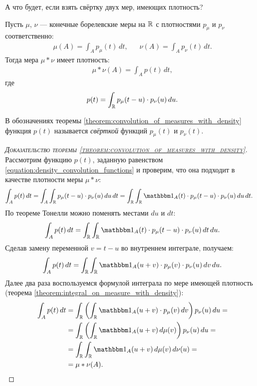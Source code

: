 \documentclass[../main.tex]{subfiles}
\begin{document}
А что будет, если взять свёртку двух мер, имеющих плотность?

\begin{thm}
 \label{theorem:convolution_of_measures_with_density}
 Пусть $ \mu $, $ \nu $ --- конечные борелевские меры на $ \mathbb{R} $ с плотностями $ p_\mu $ и $ p_\nu $ соответственно:
 \begin{align*}
  \mu(A) = \int_{A} p_\mu(t)\,dt, & &\nu(A) = \int_{A} p_\nu(t)\,dt.  
 \end{align*} Тогда мера $ \mu \ast \nu $ имеет плотность:
 \begin{align*}
  \mu \ast \nu(A) = \int_{A} p(t)\,dt, 
 \end{align*} где
 \begin{align}
  \label{equation:density_convolution_functions}
  p(t) = \int_{\mathbb{R}} p_\mu(t - u) \cdot p_\nu(u)\,du.
 \end{align} 
\end{thm}
\begin{df}
 В обозначениях теоремы \ref{theorem:convolution_of_measures_with_density} функция $ p(t) $ называется \textit{свёрткой} функций $ p_\mu(t) $ и $ p_{\nu}(t) $.
\end{df}
\begin{proof}[\normalfont\textsc{Доказательство теоремы \ref{theorem:convolution_of_measures_with_density}}] Рассмотрим функцию $ p(t) $, заданную равенством \eqref{equation:density_convolution_functions} и проверим, что она подходит в качестве плотности меры $ \mu \ast \nu $:
 \begin{align*}
  \int_{A} p(t)\,dt &= \int_{A} \int_{\R}p_\mu(t - u)\cdot p_\nu(u)\,du\,dt = \int_{\R} \int_{\R} \Ind_A(t) \cdot p_\mu(t-u) \cdot p_\nu(u)\,du\,dt.
 \end{align*} По теореме Тонелли можно поменять местами $ du $ и $ dt $:
 \begin{align*}
  \int_{A} p(t)\,dt = \int_{\R} \int_{\R} \Ind_A(t) \cdot p_\mu(t-u) \cdot p_\nu(u)\,dt\,du. 
 \end{align*} Сделав замену переменной $ v = t - u  $ во внутреннем интеграле, получаем:
 \begin{align*}
  \int_{A} p(t)\,dt = \int_{\R}\int_{\R}\Ind_A(u + v) \cdot p_\mu(v)\cdot p_\nu(u)\,dv\,du.
 \end{align*} Далее два раза воспользуемся формулой интеграла по мере имеющей плотность (теорема \ref{theorem:integral_on_measure_with_density}):
 \begin{align*}
  \int_{A} p(t)\,dt &= \int_{\R} \left( \int_{\R} \Ind_A(u+v) \cdot p_\mu(v)\,dv  \right) p_\nu(u)\,du =\\
  &= \int_{\R} \left( \int_{\R} \Ind_A(u+v)\,d\mu(v)  \right) p_\nu(u)\,du = \\
  &= \int_{\R} \int_{\R} \Ind_A(u+v)\,d\mu(v)\,d\nu(u)   = \\
  &= \mu \ast \nu(A).
 \end{align*}
\end{proof}
\end{document}
